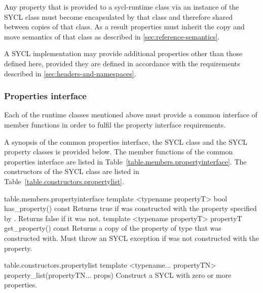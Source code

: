 Any property that is provided to a \gls{sycl-runtime} class via an instance of the SYCL  class must become encapsulated by that class and therefore shared between copies of that class. As a result properties must inherit the copy and move semantics of that class as described in \ref{sec:reference-semantics}.

A SYCL implementation may provide additional properties other than those defined here, provided they are defined in accordance with the requirements described in \ref{sec:headers-and-namespaces}.

\subsubsection{Properties interface}

Each of the runtime classes mentioned above must provide a common interface of member functions in order to fulfil the property interface requirements.

A synopsis of the common properties interface, the SYCL  class and the SYCL property classes is provided below. The member functions of the common properties interface are listed in Table~\ref{table.members.propertyinterface}. The constructors of the SYCL  class are listed in Table~\ref{table.constructors.propertylist}.


{table.members.propertyinterface}
  \addRowTwoSL
    { template <typename propertyT> }  
    { bool has_property() const }
    {
      Returns true if  was constructed with the property
      specified by . Returns false if it was
      not.
    }
  \addRowTwoSL
    { template <typename propertyT> }  
    { propertyT get_property() const }
    {
      Returns a copy of the property of type 
      that  was constructed with. Must throw an
       SYCL exception if  was not constructed with the  property.
    }
\completeTable

{table.constructors.propertylist}
\addRowTwoSL
{ template <typename... propertyTN> }
{ property_list(propertyTN... props) }
{
  Construct a SYCL  with zero or more properties.
}
\completeTable

